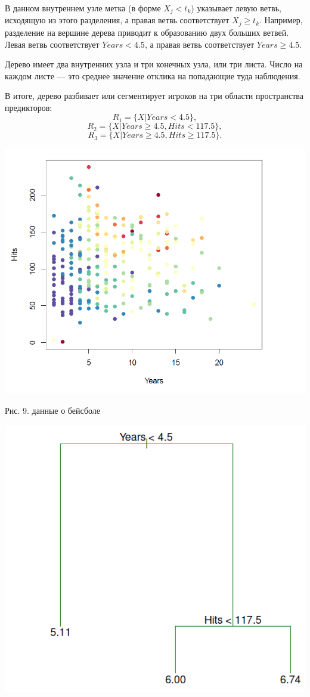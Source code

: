 \documentclass{article}
\begin{document}
В данном внутреннем узле метка (в форме $X_j < t_k$) указывает левую ветвь, исходящую из этого разделения, а правая ветвь соответствует $X_j \geq t_k$. Например, разделение на вершине дерева приводит к образованию двух больших ветвей. Левая ветвь соответствует $Years < 4.5$, а правая ветвь соответствует $Years \geq 4.5$.

Дерево имеет два внутренних узла и три конечных узла, или три листа. Число на каждом листе --- это среднее значение отклика на попадающие туда наблюдения.

В итоге, дерево разбивает или сегментирует игроков на три области пространства предикторов:
$$R_1 = \{ X | Years < 4.5 \},$$
$$R_2 = \{ X | Years \geq 4.5, Hits < 117.5 \},$$
$$R_3 = \{ X | Years \geq 4.5, Hits \geq 117.5 \}.$$
\begin{center}
	\includegraphics[scale=0.3]{pic61}
\end{center}
\begin{center}
	Рис. 9. данные о бейсболе
\end{center}
\begin{center}
	\includegraphics[scale=0.4]{pic62}
\end{center}
\end{document}

